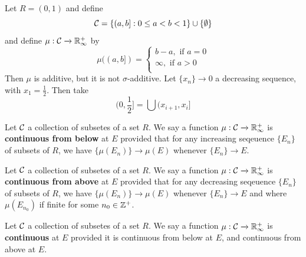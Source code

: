 \begin{example}\label{example_3}
    Let $R=(0,1)$ and define
    \begin{equation*}
        \mathcal{C}=\{(a,b] : 0 \leq a<b<1\} \cup \{\emptyset\}
    \end{equation*}
    and define $\mu:\mathcal{C} \xrightarrow{} \mathbb{R}^+_\infty$ by
    \begin{equation*}
        \mu((a,b])=\begin{cases}
                    b-a, \text{ if } a=0    \\
                    \infty, \text{ if } a>0 \\
                 \end{cases}
    \end{equation*}
    Then $\mu$ is additive, but it is not  $\sigma$-additive. Let  $\{x_n\}
    \xrightarrow{} 0$ a decreasing sequence, with $x_1=\frac{1}{2}$. Then take
    \begin{equation*}
        (0,\frac{1}{2}]=\bigcup{(x_{i+1},x_i]}
    \end{equation*}
\end{example}

\begin{definition}
    Let $\mathcal{C}$ a collection of subsetes of a set $R$. We say a function $\mu:\mathcal{C}
    \xrightarrow{} \mathbb{R}^+_\infty$ is \textbf{continuous from below} at $E$
    provided that for any increasing seqeuence $\{E_n\}$ of subsets of $R$, we
    have $\{\mu(E_n)\} \xrightarrow{} \mu(E)$ whenever $\{E_n\} \xrightarrow{}
    E$.
\end{definition}

\begin{definition}
    Let $\mathcal{C}$ a collection of subsetes of a set $R$. We say a function $\mu:\mathcal{C}
    \xrightarrow{} \mathbb{R}^+_\infty$ is \textbf{continuous from above} at $E$
    provided that for any decreasing seqeuence $\{E_n\}$ of subsets of $R$, we
    have $\{\mu(E_n)\} \xrightarrow{} \mu(E)$ whenever $\{E_n\} \xrightarrow{}
    E$ and where $\mu(E_{n_0})$ if finite for some $n_0 \in \mathbb{Z}^+$.
\end{definition}

\begin{definition}
    Let $\mathcal{C}$ a collection of subsetes of a set $R$. We say a function $\mu:\mathcal{C}
    \xrightarrow{} \mathbb{R}^+_\infty$ is \textbf{continuous} at $E$ provided it is
    continuous from below at $E$, and continuous from above at $E$.
\end{definition}

